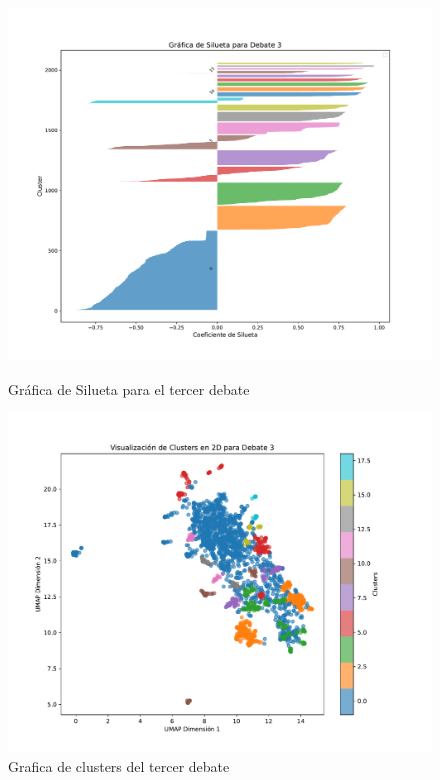 \documentclass[10pt, a4paper]{article}
\begin{document}
	\begin{figure}[h!]
		\centering
		\begin{minipage}{0.49\textwidth} %
			\includegraphics[width=\linewidth]{silhouette_debate3.pdf} 
			\caption{Gráfica de Silueta para el tercer debate}
			\label{fig:silDeb3}
		\end{minipage}
		\hfill %
		\begin{minipage}{0.49\textwidth}
			\includegraphics[width=\linewidth]{clusters_debate3.pdf}
			\caption{Grafica de clusters del tercer debate}
			\label{fig:clustDeb3}
		\end{minipage}
	\end{figure}
	
\end{document}
